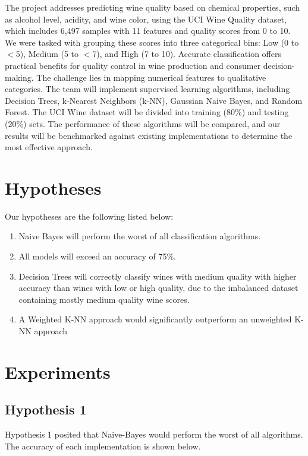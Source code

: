 \documentclass{article}
\theoremstyle{plain}
\theoremstyle{definition}
\theoremstyle{remark}
\begin{document}
The project addresses predicting wine quality based on chemical properties, such as alcohol level, acidity, and wine color, using the UCI Wine Quality dataset, which includes 6,497 samples with 11 features and quality scores from 0 to 10. We were tasked with grouping these scores into three categorical bins: Low (0 to $<$5), Medium (5 to $<$7), and High (7 to 10). Accurate classification offers practical benefits for quality control in wine production and consumer decision-making. The challenge lies in mapping numerical features to qualitative categories. The team will implement supervised learning algorithms, including Decision Trees, k-Nearest Neighbors (k-NN), Gaussian Naive Bayes, and Random Forest. The UCI Wine dataset will be divided into training (80\%) and testing (20\%) sets. The performance of these algorithms will be compared, and our results will be benchmarked against existing implementations to determine the most effective approach.

\newpage

\section{Hypotheses}

Our hypotheses are the following listed below:

\begin{enumerate}
    \item Naive Bayes will perform the worst of all classification algorithms.
    \item All models will exceed an accuracy of 75\%.
    \item Decision Trees will correctly classify wines with medium quality with higher accuracy than wines with low or high quality, due to the imbalanced dataset containing mostly medium quality wine scores.
    \item A Weighted K-NN approach would significantly
    outperform an unweighted K-NN approach
\end{enumerate}

\section{Experiments}

\subsection{Hypothesis 1}

Hypothesis 1 posited that Naive-Bayes would perform the worst of all algorithms. The accuracy of each implementation is shown below.
\end{document}
